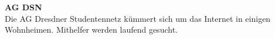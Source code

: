 
\begin{multicols}{2}

\textbf{AG DSN} \\
Die AG Dresdner Studentennetz kümmert sich um das Internet in einigen Wohnheimen.
Mithelfer werden laufend gesucht.~









\end{multicols}
